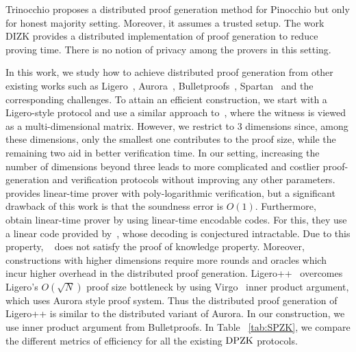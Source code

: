 Trinocchio \cite{trinocchio} proposes a distributed proof generation method for
Pinocchio  \cite{pinnochio_PHGR} but only for honest majority setting. Moreover, it assumes a trusted setup. 
The work DIZK \cite{dizk} provides a distributed implementation of proof generation to reduce proving time. There is no notion of privacy among the provers in this setting.

In this work, we study how to achieve distributed proof generation from other existing works such as Ligero~\cite{ligero}, Aurora~\cite{aurora}, Bulletproofs~\cite{bulletproofs}, Spartan~\cite{spartan} and the corresponding challenges. To attain an efficient construction, we start with a Ligero-style protocol and use a similar approach to~\cite{bootle2020linear, bootle2020zero}, where the witness is viewed as a multi-dimensional matrix. However, we restrict to 3 dimensions since, among these dimensions, only the smallest one contributes to the proof size, while the remaining two aid in better verification time. In our setting, increasing the number of dimensions beyond three leads to more complicated and costlier proof-generation and verification protocols without improving any other parameters. \cite{bootle2020zero} provides linear-time prover with poly-logarithmic verification, but a significant drawback of this work is that the soundness error is $O(1)$. Furthermore,~\cite{bootle2020linear} obtain linear-time prover by using linear-time encodable codes. For this, they use a linear code provided by~\cite{druk2014linear}, whose decoding is conjectured intractable. Due to this property, ~\cite{bootle2020linear} does not satisfy the proof of knowledge property. Moreover, constructions with higher dimensions require more rounds and oracles which incur higher overhead in the distributed proof generation. Ligero++~\cite{ligero++} overcomes Ligero's $O(\sqrt{N})$ proof size bottleneck by using Virgo~\cite{Virgo} inner product argument, which uses Aurora style proof system. Thus the distributed proof generation of Ligero++ is similar to the distributed variant of Aurora. In our construction, we use inner product argument from Bulletproofs. In Table ~\ref{tab:SPZK}, we compare the different metrics of efficiency for all the existing $\text{DPZK}$ protocols.
%

